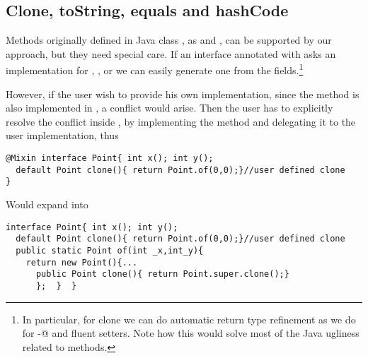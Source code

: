 \subsection{Clone, toString, equals and hashCode}
Methods originally defined in Java class \Q@Object@, as \Q@clone@ and \Q@toString@, can be supported by our approach, but they need special care. If an interface annotated with \mixin asks an implementation for \Q@clone@, \Q@toString@, \Q@equals@ or \Q@hashCode@ we can easily generate one from the fields.\footnote{In particular, for clone we can do automatic return type refinement as we do for \Q@with-@ and fluent setters. Note how this would solve most of the Java ugliness related to \Q@clone@ methods.}

However, if the user wish to provide his own implementation, since the method is
also implemented in \Q@Object@, a conflict would arise. Then the user has to
explicitly resolve the conflict inside \Q@of@, by implementing the method and
delegating it to the user implementation, thus
\begin{lstlisting}
@Mixin interface Point{ int x(); int y();
  default Point clone(){ return Point.of(0,0);}//user defined clone
}
\end{lstlisting} 
Would expand into 

\begin{lstlisting}
interface Point{ int x(); int y();
  default Point clone(){ return Point.of(0,0);}//user defined clone
  public static Point of(int _x,int_y){
    return new Point(){...
      public Point clone(){ return Point.super.clone();}
      };  }  }
\end{lstlisting} 
